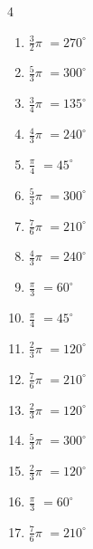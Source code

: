 \begin{multicols}{4}
\begin{enumerate}
  \item $\displaystyle \frac{3}{2}\pi$
        $\displaystyle =270^{\circ}$

  \item $\displaystyle \frac{5}{3}\pi$
        $\displaystyle =300^{\circ}$

  \item $\displaystyle \frac{3}{4}\pi$
        $\displaystyle =135^{\circ}$

  \item $\displaystyle \frac{4}{3}\pi$
        $\displaystyle =240^{\circ}$

  \item $\displaystyle \frac{\pi}{4}$
        $\displaystyle =45^{\circ}$

  \item $\displaystyle \frac{5}{3}\pi$
        $\displaystyle =300^{\circ}$

  \item $\displaystyle \frac{7}{6}\pi$
        $\displaystyle =210^{\circ}$

  \item $\displaystyle \frac{4}{3}\pi$
        $\displaystyle =240^{\circ}$

  \item $\displaystyle \frac{\pi}{3}$
        $\displaystyle =60^{\circ}$

  \item $\displaystyle \frac{\pi}{4}$
        $\displaystyle =45^{\circ}$

  \item $\displaystyle \frac{2}{3}\pi$
        $\displaystyle =120^{\circ}$

  \item $\displaystyle \frac{7}{6}\pi$
        $\displaystyle =210^{\circ}$

  \item $\displaystyle \frac{2}{3}\pi$
        $\displaystyle =120^{\circ}$

  \item $\displaystyle \frac{5}{3}\pi$
        $\displaystyle =300^{\circ}$

  \item $\displaystyle \frac{2}{3}\pi$
        $\displaystyle =120^{\circ}$

  \item $\displaystyle \frac{\pi}{3}$
        $\displaystyle =60^{\circ}$

  \item $\displaystyle \frac{7}{6}\pi$
        $\displaystyle =210^{\circ}$


\end{enumerate}
\end{multicols}
